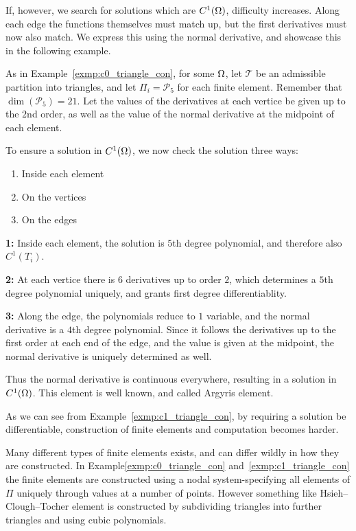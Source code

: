 If, however, we search for solutions which 
are $C^1(\Omega)$, difficulty increases. Along each edge the functions 
themselves must match up, but the first derivatives must now also match. 
We express this using the normal derivative, and showcase this in the 
following example. 
\begin{exmp}{\quad\label{exmp:c1_triangle_con}}
   As in Example~\ref{exmp:c0_triangle_con}, 
    for some $\Omega$, let $\mathcal{T}$ be an admissible partition into 
    triangles, and let $\Pi_i = \mathcal{P}_5$ for each finite element.
    Remember that $\dim(\mathcal{P}_5) = 21$.
    Let the values of the derivatives at each vertice be given up 
    to the $2$nd order, as well as the value of the normal derivative at the 
    midpoint of each element.
    
    To ensure a solution in $C^1(\Omega)$, 
    we now check the solution three ways:
    \begin{enumerate}
        \item Inside each element
        \item On the vertices
        \item On the edges
    \end{enumerate} 
    \textbf{1:} Inside each element, the solution is $5$th degree polynomial, 
    and therefore also $C^1(T_i)$.

    \textbf{2:} At each vertice there is $6$ derivatives up to order $2$, which 
    determines a $5$th degree polynomial uniquely, and grants first 
    degree differentiablity.

    \textbf{3:} Along the edge, the polynomials reduce to $1$ variable, and the 
    normal derivative is a $4$th degree polynomial. Since it follows 
    the derivatives up to the first order at each end of the edge, and 
    the value is given at the midpoint, the normal derivative is uniquely 
    determined as well.

    Thus the normal derivative is continuous everywhere, resulting in a 
    solution in $C^1(\Omega)$. This element is well known, and called 
    Argyris element.
\end{exmp}
As we can see from Example~\ref{exmp:c1_triangle_con}, by requiring a 
solution be differentiable, construction of finite elements and computation 
becomes harder. 

Many different types of finite elements exists, and can differ wildly in how they 
are constructed. In Example\ref{exmp:c0_triangle_con} and~\ref{exmp:c1_triangle_con} 
the finite elements are constructed using a nodal system-specifying all elements of $\Pi$ 
uniquely through values at a number of points. However something like Hsieh–Clough–Tocher element 
is constructed by subdividing triangles into further triangles and using 
cubic polynomials.

